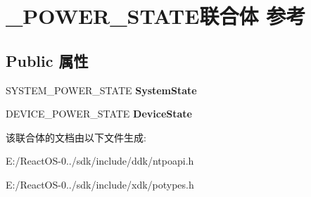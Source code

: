 \hypertarget{union___p_o_w_e_r___s_t_a_t_e}{}\section{\+\_\+\+P\+O\+W\+E\+R\+\_\+\+S\+T\+A\+T\+E联合体 参考}
\label{union___p_o_w_e_r___s_t_a_t_e}
\subsection*{Public 属性}
\begin{DoxyCompactItemize}
\item 
\mbox{\label{union___p_o_w_e_r___s_t_a_t_e_aa2a1d9aa843d96846c086b504e9aa906}} 
S\+Y\+S\+T\+E\+M\+\_\+\+P\+O\+W\+E\+R\+\_\+\+S\+T\+A\+TE {\bfseries System\+State}
\item 
\mbox{\label{union___p_o_w_e_r___s_t_a_t_e_a2266bde3864e8ac648937d1b0d5fe742}} 
D\+E\+V\+I\+C\+E\+\_\+\+P\+O\+W\+E\+R\+\_\+\+S\+T\+A\+TE {\bfseries Device\+State}
\end{DoxyCompactItemize}


该联合体的文档由以下文件生成\+:\begin{DoxyCompactItemize}
\item 
E\+:/\+React\+O\+S-\/0../sdk/include/ddk/ntpoapi.\+h\item 
E\+:/\+React\+O\+S-\/0../sdk/include/xdk/potypes.\+h\end{DoxyCompactItemize}
